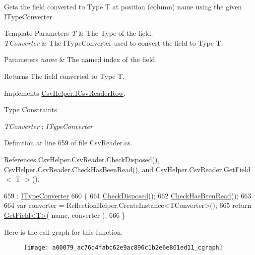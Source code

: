 Gets the field converted to Type T at position (column) name using the given I\-Type\-Converter. 


\begin{DoxyTemplParams}{Template Parameters}
{\em T} & The Type of the field.\\
\hline
{\em T\-Converter} & The I\-Type\-Converter used to convert the field to Type T.\\
\hline
\end{DoxyTemplParams}

\begin{DoxyParams}{Parameters}
{\em name} & The named index of the field.\\
\hline
\end{DoxyParams}
\begin{DoxyReturn}{Returns}
The field converted to Type T.
\end{DoxyReturn}


Implements \hyperlink{a00117_ae7ea281792a1e0e8f64991062a3acffb}{Csv\-Helper.\-I\-Csv\-Reader\-Row}.

\begin{Desc}
\item[Type Constraints]\begin{description}
\item[{\em T\-Converter} : {\em I\-Type\-Converter}]\end{description}
\end{Desc}


Definition at line 659 of file Csv\-Reader.\-cs.



References Csv\-Helper.\-Csv\-Reader.\-Check\-Disposed(), Csv\-Helper.\-Csv\-Reader.\-Check\-Has\-Been\-Read(), and Csv\-Helper.\-Csv\-Reader.\-Get\-Field$<$ T $>$().


\begin{DoxyCode}
659                                                                                  : 
      \hyperlink{a00125}{ITypeConverter}
660         \{
661             \hyperlink{a00079_a6fa45a46ed1322dc1872ca2321b5edbc}{CheckDisposed}();
662             \hyperlink{a00079_a2d9249171ed1568e45d152766d364c31}{CheckHasBeenRead}();
663 
664             var converter = ReflectionHelper.CreateInstance<TConverter>();
665             \textcolor{keywordflow}{return} \hyperlink{a00079_a6a43cfaf39caea93ecd87e506be7b404}{GetField<T>}( name, converter );
666         \}
\end{DoxyCode}


Here is the call graph for this function\-:
\nopagebreak
\begin{figure}[H]
\begin{center}
\leavevmode
\texttt{[image: a00079\_ac76d4fabc62e9ac896c1b2e6e861ed11\_cgraph]}
\end{center}
\end{figure}


